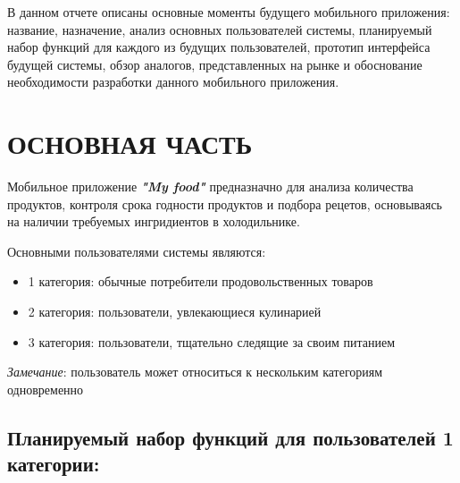 \documentclass[14pt]{extreport}
\begin{document}
\pagestyle{empty} %

\pagestyle{plain} %

\tableofcontents

\intro

В данном отчете описаны основные моменты будущего мобильного приложения: название, назначение, анализ основных пользователей системы, планируемый набор функций для каждого из будущих пользователей, прототип интерфейса будущей системы, обзор аналогов, представленных на рынке и обоснование необходимости разработки данного мобильного приложения.

\chapter{ОСНОВНАЯ ЧАСТЬ}

Мобильное приложение \textbf{\textit{"My food"}} предназначно для анализа количества продуктов, контроля срока годности продуктов и подбора рецетов, основываясь на наличии требуемых ингридиентов в холодильнике.

Основными пользователями системы являются: 
\begin{itemize}
    \item 1 категория: обычные потребители продовольственных товаров
    \item 2 категория: пользователи, увлекающиеся кулинарией
    \item 3 категория: пользователи, тщательно следящие за своим питанием
\end{itemize}
\textit{Замечание}: пользователь может относиться к нескольким категориям одновременно

\section{Планируемый набор функций для пользователей 1 категории: }
\end{document}
